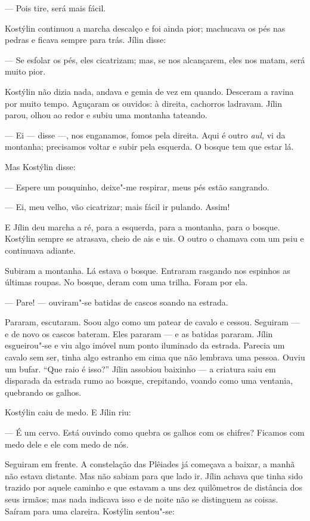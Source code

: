 --- Pois tire, será mais fácil.

Kostýlin continuou a marcha descalço e foi ainda pior; machucava os pés
nas pedras e ficava sempre para trás. Jílin disse:

--- Se esfolar os pés, eles cicatrizam; mas, se nos alcançarem, eles nos
matam, será muito pior.

Kostýlin não dizia nada, andava e gemia de vez em quando. Desceram a
ravina por muito tempo. Aguçaram os ouvidos: à direita, cachorros
ladravam. Jílin parou, olhou ao redor e subiu uma montanha tateando.

--- Ei --- disse ---, nos enganamos, fomos pela direita. Aqui é outro
\emph{aul,} vi da montanha; precisamos voltar e subir pela esquerda. O
bosque tem que estar lá.

Mas Kostýlin disse:

--- Espere um pouquinho, deixe"-me respirar, meus pés estão sangrando.

--- Ei, meu velho, vão cicatrizar; mais fácil ir pulando. Assim!

E Jílin deu marcha a ré, para a esquerda, para a montanha, para o
bosque. Kostýlin sempre se atrasava, cheio de ais e uis. O outro o
chamava com um psiu e continuava adiante.

Subiram a montanha. Lá estava o bosque. Entraram rasgando nos espinhos
as últimas roupas. No bosque, deram com uma trilha. Foram por ela.

--- Pare! --- ouviram"-se batidas de cascos soando na estrada.

Pararam, escutaram. Soou algo como um patear de cavalo e cessou.
Seguiram --- e de novo os cascos bateram. Eles pararam --- e as batidas
pararam. Jílin esgueirou"-se e viu algo imóvel num ponto iluminado da
estrada. Parecia um cavalo sem ser, tinha algo estranho em cima que não
lembrava uma pessoa. Ouviu um bufar. ``Que raio é isso?'' Jílin assobiou
baixinho --- a criatura saiu em disparada da estrada rumo ao bosque,
crepitando, voando como uma ventania, quebrando os galhos.

Kostýlin caiu de medo. E Jílin riu:

--- É um cervo. Está ouvindo como quebra os galhos com os chifres?
Ficamos com medo dele e ele com medo de nós.

Seguiram em frente. A constelação das Plêiades já começava a baixar, a
manhã não estava distante. Mas não sabiam para que lado ir. Jílin achava
que tinha sido trazido por aquele caminho e que estavam a uns dez
quilômetros de distância dos seus irmãos; mas nada indicava isso e de
noite não se distinguem as coisas. Saíram para uma clareira. Kostýlin
sentou"-se:


